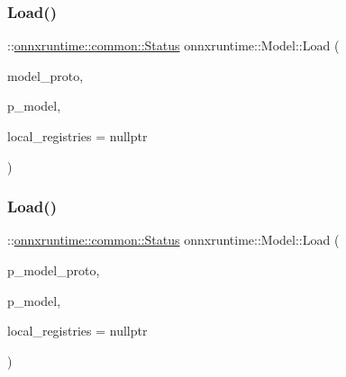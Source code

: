 \subsubsection{\texorpdfstring{Load()}{Load()}\hspace{0.1cm}{\footnotesize\ttfamily [4/5]}}
{\footnotesize\ttfamily \+::\mbox{\hyperlink{classonnxruntime_1_1common_1_1Status}{onnxruntime\+::common\+::\+Status}} onnxruntime\+::\+Model\+::\+Load (\begin{DoxyParamCaption}\item[{const O\+N\+N\+X\+\_\+\+N\+A\+M\+E\+S\+P\+A\+C\+E\+::\+Model\+Proto \&}]{model\+\_\+proto,  }\item[{std\+::shared\+\_\+ptr$<$ \mbox{\hyperlink{classonnxruntime_1_1Model}{Model}} $>$ \&}]{p\+\_\+model,  }\item[{const \mbox{\hyperlink{namespaceonnxruntime_a37a91305e7190e83fa9c66117a6a4746}{I\+Onnx\+Runtime\+Op\+Schema\+Registry\+List}} $\ast$}]{local\+\_\+registries = {\ttfamily nullptr} }\end{DoxyParamCaption})\hspace{0.3cm}{\ttfamily [static]}}

\mbox{\label{classonnxruntime_1_1Model_ac3349b0c44c0adacf291f6ea79abf210}} 
\subsubsection{\texorpdfstring{Load()}{Load()}\hspace{0.1cm}{\footnotesize\ttfamily [5/5]}}
{\footnotesize\ttfamily \+::\mbox{\hyperlink{classonnxruntime_1_1common_1_1Status}{onnxruntime\+::common\+::\+Status}} onnxruntime\+::\+Model\+::\+Load (\begin{DoxyParamCaption}\item[{std\+::unique\+\_\+ptr$<$ O\+N\+N\+X\+\_\+\+N\+A\+M\+E\+S\+P\+A\+C\+E\+::\+Model\+Proto $>$}]{p\+\_\+model\+\_\+proto,  }\item[{std\+::shared\+\_\+ptr$<$ \mbox{\hyperlink{classonnxruntime_1_1Model}{Model}} $>$ \&}]{p\+\_\+model,  }\item[{const \mbox{\hyperlink{namespaceonnxruntime_a37a91305e7190e83fa9c66117a6a4746}{I\+Onnx\+Runtime\+Op\+Schema\+Registry\+List}} $\ast$}]{local\+\_\+registries = {\ttfamily nullptr} }\end{DoxyParamCaption})\hspace{0.3cm}{\ttfamily [static]}}

